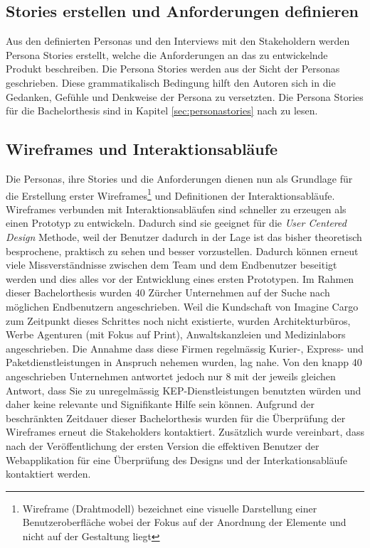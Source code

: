 \subsection{Stories erstellen und Anforderungen definieren}
Aus den definierten Personas und den Interviews mit den Stakeholdern werden Persona Stories erstellt, welche die Anforderungen an das zu entwickelnde Produkt beschreiben. Die Persona Stories werden aus der Sicht der Personas geschrieben. Diese grammatikalisch Bedingung hilft den Autoren sich in die Gedanken, Gefühle und Denkweise der Persona zu versetzten. Die Persona Stories für die Bachelorthesis sind in Kapitel \ref{sec:personastories} nach zu lesen.

\subsection{Wireframes und Interaktionsabläufe}
Die Personas, ihre Stories und die Anforderungen dienen nun als Grundlage für die Erstellung erster Wireframes\footnote{ Wireframe (Drahtmodell) bezeichnet eine visuelle Darstellung einer Benutzeroberfläche wobei der Fokus auf der Anordnung der Elemente und nicht auf der Gestaltung liegt} und Definitionen der Interaktionsabläufe. Wireframes verbunden mit Interaktionsabläufen sind schneller zu erzeugen als einen Prototyp zu entwickeln. Dadurch sind sie geeignet für die \textit{User Centered Design} Methode, weil der Benutzer dadurch in der Lage ist das bisher theoretisch besprochene, praktisch zu sehen und besser vorzustellen. Dadurch können erneut viele Missverständnisse zwischen dem Team und dem Endbenutzer beseitigt werden und dies alles vor der Entwicklung eines ersten Prototypen. Im Rahmen dieser Bachelorthesis wurden 40 Zürcher Unternehmen auf der Suche nach möglichen Endbenutzern angeschrieben. Weil die Kundschaft von Imagine Cargo zum Zeitpunkt dieses Schrittes noch nicht existierte, wurden Architekturbüros, Werbe Agenturen (mit Fokus auf Print), Anwaltskanzleien und Medizinlabors angeschrieben. Die Annahme dass diese Firmen regelmässig Kurier-, Express- und Paketdienstleistungen in Anspruch nehemen wurden, lag nahe. Von den knapp 40 angeschrieben Unternehmen antwortet jedoch nur 8 mit der jeweils gleichen Antwort, dass Sie zu unregelmässig KEP-Dienstleistungen benutzten würden und daher keine relevante und Signifikante Hilfe sein können. Aufgrund der beschränkten Zeitdauer dieser Bachelorthesis wurden für die Überprüfung der Wireframes erneut die Stakeholders kontaktiert. Zusätzlich wurde vereinbart, dass nach der Veröffentlichung der ersten Version die effektiven Benutzer der Webapplikation für eine Überprüfung des Designs und der Interkationsabläufe kontaktiert werden.

